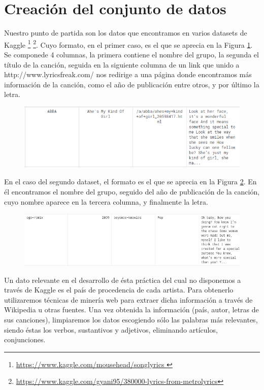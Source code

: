 \section{Creación del conjunto de datos}
Nuestro punto de partida son los datos que encontramos en varios datasets de Kaggle \footnote{\url{https://www.kaggle.com/mousehead/songlyrics }} \footnote{\url{https://www.kaggle.com/gyani95/380000-lyrics-from-metrolyrics}}. Cuyo formato, en el primer caso, es el que se aprecia en la Figura \ref{fig:dataset1}. Se componede 4 columnas, la primera contiene el nombre del grupo, la segunda el título de la canción, seguida en la siguiente columna de un link que unido a http://www.lyricsfreak.com/ nos redirige a una página donde encontramos más información de la canción, como el año de publicación entre otros, y por último la letra.
\begin{figure}
	\centering
	\includegraphics[width=0.7\linewidth]{Imagenes/dataset1}
	\caption{}
	\label{fig:dataset1}
\end{figure}
En el caso del segundo dataset, el formato es el que se aprecia en la Figura \ref{fig:dataset2}. En él encontramos el nombre del grupo, seguido del año de publicación de la canción, cuyo nombre aparece en la tercera columna, y finalmente la letra.
\begin{figure}
	\centering
	\includegraphics[width=0.7\linewidth]{Imagenes/dataset2}
	\caption{}
	\label{fig:dataset2}
\end{figure}

Un dato relevante en el desarrollo de ésta práctica del cual no disponemos a través de Kaggle es el país de procedencia de cada artista. Para obtenerlo utilizaremos técnicas de minería web para extraer dicha información a través de Wikipedia u otras fuentes. Una vez obtenida la información (país, autor, letras de sus canciones), limpiaremos los datos escogiendo sólo las palabras más relevantes, siendo éstas los verbos, sustantivos y adjetivos, eliminando artículos, conjunciones.


